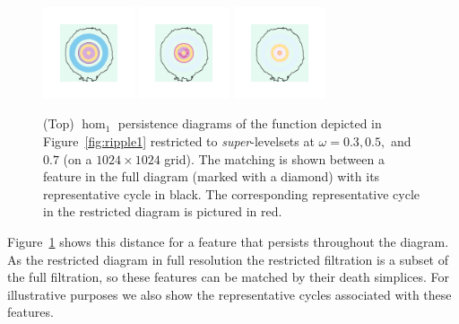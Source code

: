 \begin{figure}[htbp]
  \includegraphics[trim=500 500 500 500, clip, width=0.24\textwidth]{scripts/figures/matching2/surf_top-1_0.png}
  \includegraphics[trim=500 500 500 500, clip, width=0.24\textwidth]{scripts/figures/matching2/surf_top-1_1.png}
  \includegraphics[trim=500 500 500 500, clip, width=0.24\textwidth]{scripts/figures/matching2/surf_top-1_2.png}
  \caption{(Top) $\hom_1$ persistence diagrams of the function depicted in Figure~\ref{fig:ripple1} restricted to \emph{super}-levelsets at $\omega = 0.3, 0.5,$ and $0.7$ (on a $1024\times 1024$ grid).
  The matching is shown between a feature in the full diagram (marked with a diamond) with its representative cycle in black.
  The corresponding representative cycle in the restricted diagram is pictured in red.}\label{fig:restricted}
\end{figure}

Figure~\ref{fig:restricted} shows this distance for a feature that persists throughout the diagram.
As the restricted diagram in full resolution the restricted filtration is a subset of the full filtration, so these features can be matched by their death simplices.
For illustrative purposes we also show the representative cycles associated with these features.


